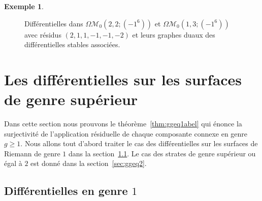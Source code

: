 \documentclass[11pt]{article}
\numberwithin{equation}{section}\renewcommand{\proofname}{Démonstration}
\let\mathcal\mathscr
\newcommand{\omoduli}[1][g]{{\Omega\mathcal M}_{\!#1}}
\theoremstyle{definition}
\newtheorem{ex}[thm]{Exemple}
\begin{document}
\begin{ex}
\begin{figure}[htb]
\caption{Différentielles dans $\omoduli[0](2,2;(-1^6))$ et $\omoduli[0](1,3;(-1^6))$ avec résidus $(2,1,1,-1,-1,-2)$ et leurs graphes duaux des différentielles stables associées.} \label{fig:graphdeliant}
\end{figure}

\end{ex}

\section{Les différentielles sur les surfaces de genre supérieur}
\label{sec:ggeq1}

Dans cette section nous prouvons le théorème~\ref{thm:ggeq1abel} qui énonce la surjectivité de l'application résiduelle de chaque composante connexe en genre $g\geq1$.
Nous allons tout d'abord traiter le cas des différentielles sur les surfaces de Riemann de genre $1$ dans la section~\ref{sec:g1}. Le cas des strates de genre supérieur ou égal à $2$ est donné dans la section~\ref{sec:ggeq2}.

\subsection{Différentielles en genre $1$}
\label{sec:g1}
\end{document}
